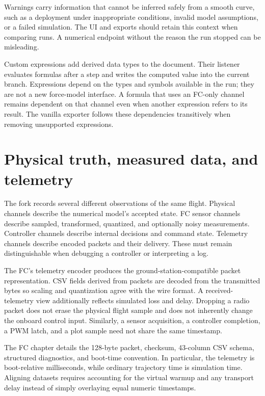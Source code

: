 Warnings carry information that cannot be inferred safely from a smooth curve, such as a deployment under inappropriate conditions, invalid model assumptions, or a failed simulation. The UI and exports should retain this context when comparing runs. A numerical endpoint without the reason the run stopped can be misleading.

Custom expressions add derived data types to the document. Their listener evaluates formulas after a step and writes the computed value into the current branch. Expressions depend on the types and symbols available in the run; they are not a new force-model interface. A formula that uses an FC-only channel remains dependent on that channel even when another expression refers to its result. The vanilla exporter follows these dependencies transitively when removing unsupported expressions.


\section{Physical truth, measured data, and telemetry}
The fork records several different observations of the same flight. Physical channels describe the numerical model's accepted state. FC sensor channels describe sampled, transformed, quantized, and optionally noisy measurements. Controller channels describe internal decisions and command state. Telemetry channels describe encoded packets and their delivery. These must remain distinguishable when debugging a controller or interpreting a log.

The FC's telemetry encoder produces the ground-station-compatible packet representation. CSV fields derived from packets are decoded from the transmitted bytes so scaling and quantization agree with the wire format. A received-telemetry view additionally reflects simulated loss and delay. Dropping a radio packet does not erase the physical flight sample and does not inherently change the onboard control input. Similarly, a sensor acquisition, a controller completion, a PWM latch, and a plot sample need not share the same timestamp.

The FC chapter details the 128-byte packet, checksum, 43-column CSV schema, structured diagnostics, and boot-time convention. In particular, the telemetry  is boot-relative milliseconds, while ordinary trajectory time is simulation time. Aligning datasets requires accounting for the virtual warmup and any transport delay instead of simply overlaying equal numeric timestamps.

